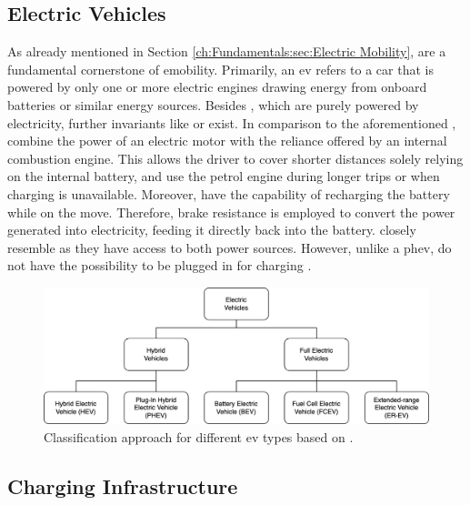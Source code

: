 \subsection{Electric Vehicles}
\label{ch:Fundamentals:sec:Electric Mobility:Electric Vehicles}

As already mentioned in Section \ref{ch:Fundamentals:sec:Electric Mobility},  are a fundamental cornerstone of \acrshort{emobility}. Primarily, an \acrshort{ev} refers to a car that is powered by only one or more electric engines drawing energy from onboard batteries or similar energy sources. 
Besides , which are purely powered by electricity, further invariants like  or  exist. In comparison to the aforementioned ,  combine the power of an electric motor with the reliance offered by an internal combustion engine.
This allows the driver to cover shorter distances solely relying on the internal battery, and use the petrol engine during longer trips or when charging is unavailable. Moreover,  have the capability of recharging the battery while on the move.
Therefore, brake resistance is employed to convert the power generated into electricity, feeding it directly back into the battery.
 closely resemble  as they have access to both power sources. However, unlike a \acrshort{phev},  do not have the possibility to be plugged in for charging \cite{kathiresh_e-mobility_2022}.

\begin{figure}[h]
    \centering
    \includegraphics[width=\textwidth]{resources/images/main/1_fundamentals/ElectricVehicleTypes.png}
    \caption{Classification approach for different \acrshort{ev} types based on \cite{acharige_review_2023}.}
    \label{fig:ev-classification}
\end{figure}

\subsection{Charging Infrastructure}
\label{ch:Fundamentals:sec:Electric Mobility:ssec:Charging Infrastructure}

